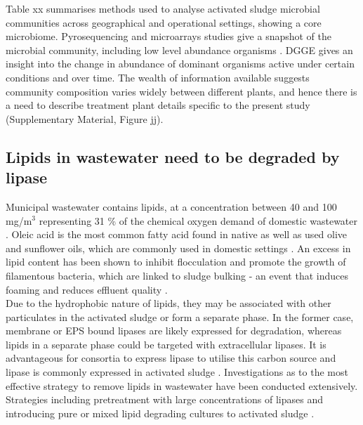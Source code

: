\documentclass[twoside]{article}
\begin{document}
Table xx summarises methods used to analyse activated sludge microbial communities across geographical and operational settings, showing a core microbiome. Pyrosequencing and microarrays studies give a snapshot of the microbial community, including low level abundance organisms \cite{ranasinghe2012revealing}. DGGE gives an insight into the change in abundance of dominant organisms active under certain conditions and over time. The wealth of information available suggests community composition varies widely between different plants, and hence there is a need to describe treatment plant details specific to the present study (Supplementary Material, Figure jj).
\FloatBarrier

\subsection{Lipids in wastewater need to be degraded by lipase}
Municipal wastewater contains lipids, at a concentration between 40 and 100 mg/m$^{3}$ \cite{Forster_92} representing 31 \% of the chemical oxygen demand of domestic wastewater \cite{Raunkjaer_94}. Oleic acid is the most common fatty acid found in native as well as used olive and sunflower oils, which are commonly used in domestic settings \cite{haba2000isolation}.  An excess in lipid content has been shown to inhibit flocculation and promote the growth of filamentous bacteria, which are linked to sludge bulking - an event that induces foaming and reduces effluent quality \cite{Forster_92}.\\

Due to the hydrophobic nature of lipids, they may be associated with other particulates in the activated sludge or form a separate phase. In the former case, membrane or EPS bound lipases are likely expressed for degradation, whereas lipids in a separate phase could be targeted with extracellular lipases. It is advantageous for consortia to express lipase to utilise this carbon source and lipase is commonly expressed in activated sludge \cite{gessesse2003lipase}. Investigations as to the most effective strategy to remove lipids in wastewater have been conducted extensively. Strategies including pretreatment with large concentrations of lipases and introducing pure or mixed lipid degrading cultures to activated sludge \cite{Wakelin_97}. \\%
\end{document}
